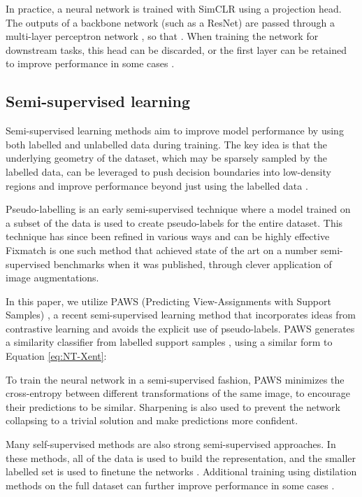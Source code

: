 \documentclass{article}
\begin{document}
In practice, a neural network is trained with SimCLR using a projection head. The outputs of a backbone network  (such as a ResNet) are passed through a multi-layer perceptron network , so that . When training the network for downstream tasks, this head can be discarded, or the first layer can be retained to improve performance in some cases \citep{chen2020big}.

\subsection{Semi-supervised learning}

Semi-supervised learning methods aim to improve model performance by using both labelled and unlabelled data during training. The key idea is that the underlying geometry of the dataset, which may be sparsely sampled by the labelled data, can be leveraged to push decision boundaries into low-density regions and improve performance beyond just using the labelled data \citep{van2020survey}. 

Pseudo-labelling \citep{lee2013pseudo} is an early semi-supervised technique where a model trained on a subset of the data is used to create pseudo-labels for the entire dataset. This technique has since been refined in various ways and can be highly effective \textemdash{} Fixmatch \citep{sohn2020fixmatch} is one such method that achieved state of the art on a number semi-supervised benchmarks when it was published, through clever application of image augmentations.



In this paper, we utilize PAWS (Predicting View-Assignments with Support Samples) \citep{assran2021semi}, a recent semi-supervised learning method that incorporates ideas from contrastive learning and avoids the explicit use of pseudo-labels. PAWS generates a similarity classifier from labelled support samples , using a similar form to Equation \ref{eq:NT-Xent}:



To train the neural network in a semi-supervised fashion, PAWS minimizes the cross-entropy  between different transformations of the same image, to encourage their predictions to be similar. Sharpening is also used to prevent the network collapsing to a trivial solution and make predictions more confident.

Many self-supervised methods are also strong semi-supervised approaches. In these methods, all of the data is used to build the representation, and the smaller labelled set is used to finetune the networks \citep{chen2020simple, caron2021emerging}. Additional training using distilation methods on the full dataset can further improve performance in some cases \citep{chen2020big}.
\end{document}
